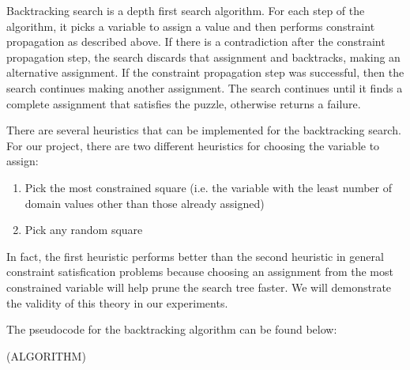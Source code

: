 Backtracking search is a depth first search algorithm. For each step of the algorithm, it picks a variable to assign a value and then performs constraint propagation as described above. If there is a contradiction after the constraint propagation step, the search discards that assignment and backtracks, making an alternative assignment. If the constraint propagation step was successful, then the search continues making another assignment. The search continues until it finds a complete assignment that satisfies the puzzle, otherwise returns a failure.

There are several heuristics that can be implemented for the backtracking search. For our project, there are two different heuristics for choosing the variable to assign:

\begin{enumerate}
	\item Pick the most constrained square (i.e. the variable with the least number of domain values other than those already assigned)
	\item Pick any random square
\end{enumerate}

In fact, the first heuristic performs better than the second heuristic in general constraint satisfication problems because choosing an assignment from the most constrained variable will help prune the search tree faster. We will demonstrate the validity of this theory in our experiments.

The pseudocode for the backtracking algorithm can be found below:

(ALGORITHM)


